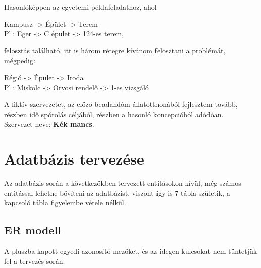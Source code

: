 \documentclass[a4paper,12pt]{article}
\begin{document}
Hasonlóképpen az egyetemi példafeladathoz, ahol
\begin{center}
	Kampusz -> Épület -> Terem \\[0.5cm]
	Pl.: Eger -> C épület -> 124-es terem,
\end{center}
felosztás található, itt is három rétegre kívánom felosztani a problémát, mégpedig:
\begin{center}
	Régió -> Épület -> Iroda\\[0.5cm]
	Pl.: Miskolc -> Orvosi rendelő -> 1-es vizsgáló
\end{center}

A fiktív szervezetet, az előző beadandóm állatotthonából fejlesztem tovább, részben idő spórolás céljából, részben a hasonló koncepcióból adódóan.\\
Szervezet neve: \textbf{Kék mancs}.


\section{Adatbázis tervezése}
Az adatbázis során a következőkben tervezett entitásokon kívül, még számos entitással lehetne bővíteni az adatbázist, viszont így is 7 tábla születik, a kapcsoló tábla figyelembe vétele nélkül.


\subsection{ER modell}
A pluszba kapott egyedi azonosító mezőket, és az idegen kulcsokat nem tüntetjük fel a tervezés során.
\end{document}
